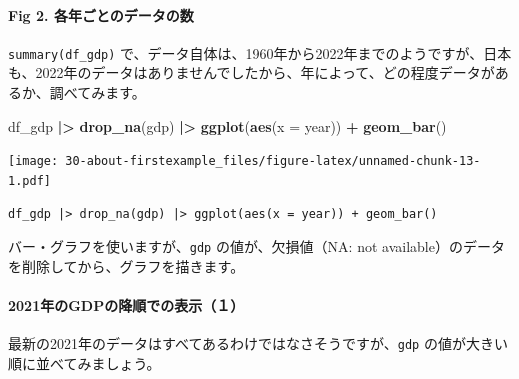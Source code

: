 \documentclass[
  xelatex, ja=standard]{bxjsbook}
\newenvironment{Shaded}{\begin{snugshade}}{\end{snugshade}}
\newcommand{\AttributeTok}[1]{\textcolor[rgb]{0.13,0.29,0.53}{#1}}
\newcommand{\FunctionTok}[1]{\textcolor[rgb]{0.13,0.29,0.53}{\textbf{#1}}}
\newcommand{\NormalTok}[1]{#1}
\newcommand{\SpecialCharTok}[1]{\textcolor[rgb]{0.81,0.36,0.00}{\textbf{#1}}}
\theoremstyle{definition}
\theoremstyle{definition}
\theoremstyle{definition}
\theoremstyle{definition}
\theoremstyle{remark}
\begin{document}
\hypertarget{fig-2.-ux5404ux5e74ux3054ux3068ux306eux30c7ux30fcux30bfux306eux6570-1}{%
\paragraph{Fig 2. 各年ごとのデータの数}\label{fig-2.-ux5404ux5e74ux3054ux3068ux306eux30c7ux30fcux30bfux306eux6570-1}}

\texttt{summary(df\_gdp)} で、データ自体は、1960年から2022年までのようですが、日本も、2022年のデータはありませんでしたから、年によって、どの程度データがあるか、調べてみます。

\begin{Shaded}
\begin{Highlighting}[]
\NormalTok{df\_gdp }\SpecialCharTok{|\textgreater{}} \FunctionTok{drop\_na}\NormalTok{(gdp) }\SpecialCharTok{|\textgreater{}} \FunctionTok{ggplot}\NormalTok{(}\FunctionTok{aes}\NormalTok{(}\AttributeTok{x =}\NormalTok{ year)) }\SpecialCharTok{+} \FunctionTok{geom\_bar}\NormalTok{()}
\end{Highlighting}
\end{Shaded}

\texttt{[image: 30-about-firstexample\_files/figure-latex/unnamed-chunk-13-1.pdf]}

\begin{verbatim}
df_gdp |> drop_na(gdp) |> ggplot(aes(x = year)) + geom_bar()
\end{verbatim}

バー・グラフを使いますが、\texttt{gdp} の値が、欠損値（NA: not available）のデータを削除してから、グラフを描きます。

\hypertarget{ux5e74ux306egdpux306eux964dux9806ux3067ux306eux8868ux793auxff11-1}{%
\paragraph{2021年のGDPの降順での表示（１）}\label{ux5e74ux306egdpux306eux964dux9806ux3067ux306eux8868ux793auxff11-1}}

最新の2021年のデータはすべてあるわけではなさそうですが、\texttt{gdp} の値が大きい順に並べてみましょう。
\end{document}
